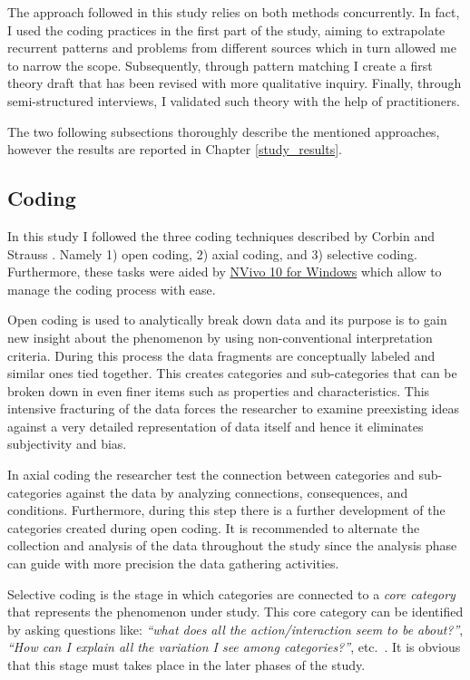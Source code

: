 The approach followed in this study relies on both methods concurrently. In fact, I used the coding practices in the first part of the study, aiming to extrapolate recurrent patterns and problems from different sources which in turn allowed me to narrow the scope. Subsequently, through pattern matching I create a first theory draft that has been revised with more qualitative inquiry. Finally, through semi-structured interviews, I validated such theory with the help of practitioners.

The two following subsections thoroughly describe the mentioned approaches, however the results are reported in Chapter \ref{study_results}.

\subsection{Coding}
In this study I followed the three coding techniques described by Corbin and Strauss \cite{coding_guidelines}. Namely 1) open coding, 2) axial coding, and 3) selective coding. Furthermore, these tasks were aided by \href{http://www.qsrinternational.com/products_nvivo.aspx}{NVivo 10 for Windows} which allow to manage the coding process with ease.

Open coding is used to analytically break down data and its purpose is to gain new insight about the phenomenon by using non-conventional interpretation criteria. During this process the data fragments are conceptually labeled and similar ones tied together. This creates categories and sub-categories that can be broken down in even finer items such as properties and characteristics. This intensive fracturing of the data forces the researcher to examine preexisting ideas against a very detailed representation of data itself and hence it eliminates subjectivity and bias.

In axial coding the researcher test the connection between categories and sub-categories against the data by analyzing connections, consequences, and conditions. Furthermore, during this step there is a further development of the categories created during open coding. It is recommended to alternate the collection and analysis of the data throughout the study since the analysis phase can guide with more precision the data gathering activities.

Selective coding is the stage in which categories are connected to a \textit{core category} that represents the phenomenon under study. This core category can be identified by asking questions like: \textit{``what does all the action/interaction seem to be about?''}, \textit{``How can I explain all the variation I see among categories?''}, etc.\ \cite{coding_guidelines}. It is obvious that this stage must takes place in the later phases of the study.

